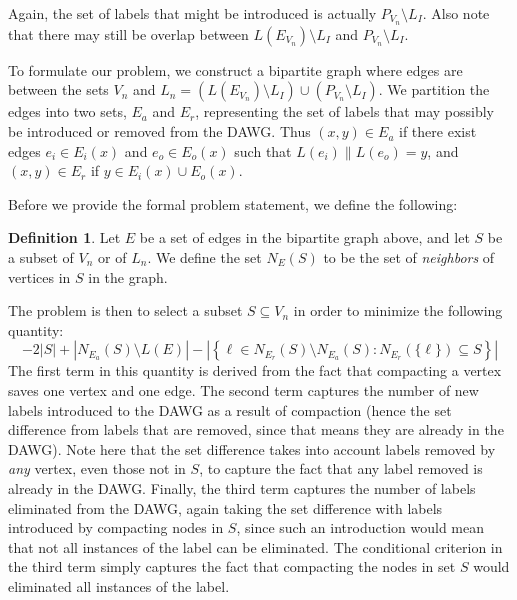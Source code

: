 \documentclass{article}
\newcommand{\emxs}[1]{\ensuremath{#1}\xspace}
\newcommand{\edges}{\emxs{E}}
\newcommand{\immutlabels}{\emxs{L_I}}
\newcommand{\labelfunc}{\emxs{L}}
\newcommand{\vertices}{\emxs{V}}
\theoremstyle{definition}
\newtheorem{definition}{Definition}
\begin{document}
Again, the set of labels that might be introduced is actually $P_{\vertices_n}
\setminus \immutlabels$. Also note that there may still be overlap between
$\labelfunc(\edges_{\vertices_n}) \setminus \immutlabels$ and $P_{\vertices_n}
\setminus \immutlabels$.

To formulate our problem, we construct a bipartite graph where edges are between
the sets $\vertices_n$ and $\labelfunc_n = (\labelfunc(\edges_{\vertices_n})
\setminus \immutlabels) \cup (P_{\vertices_n} \setminus \immutlabels)$. We
partition the edges into two sets, $\edges_a$ and $\edges_r$, representing the
set of labels that may possibly be introduced or removed from the DAWG. Thus
$(x, y) \in \edges_a$ if there exist edges $e_i \in \edges_i(x)$ and $e_o \in
\edges_o(x)$ such that $\labelfunc(e_i) \| \labelfunc(e_o) = y$, and $(x, y) \in
\edges_r$ if $y \in \edges_i(x) \cup \edges_o(x)$.

Before we provide the formal problem statement, we define the following:

\begin{definition}
  Let $E$ be a set of edges in the bipartite graph above, and let $S$ be a
  subset of $\vertices_n$ or of $\labelfunc_n$. We define the set $N_E(S)$ to be
  the set of \emph{neighbors} of vertices in $S$ in the graph.
\end{definition}

The problem is then to select a subset $S \subseteq \vertices_n$ in order to
minimize the following quantity:
\[
  -2|S| + |N_{\edges_a}(S) \setminus \labelfunc(\edges)| - \left|\left\{
    \ell \in N_{\edges_r}(S) \setminus N_{\edges_a}(S): N_{\edges_r}(\{\ell\})
    \subseteq S \right\}\right|
\]
The first term in this quantity is derived from the fact that compacting a
vertex saves one vertex and one edge. The second term captures the number of new
labels introduced to the DAWG as a result of compaction (hence the set
difference from labels that are removed, since that means they are already in
the DAWG). Note here that the set difference takes into account labels removed
by \emph{any} vertex, even those not in $S$, to capture the fact that any label
removed is already in the DAWG. Finally, the third term captures the number of
labels eliminated from the DAWG, again taking the set difference with labels
introduced by compacting nodes in $S$, since such an introduction would mean
that not all instances of the label can be eliminated. The conditional criterion
in the third term simply captures the fact that compacting the nodes in set $S$
would eliminated all instances of the label.
\end{document}
